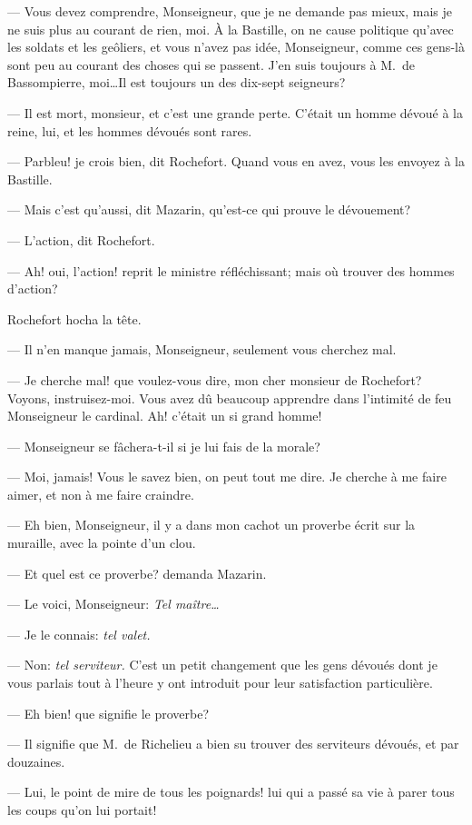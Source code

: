 — Vous devez comprendre, Monseigneur, que je ne demande pas mieux, mais je ne suis plus au courant de rien, moi. À la Bastille, on ne cause politique qu'avec les soldats et les geôliers, et vous n'avez pas idée, Monseigneur, comme ces gens-là sont peu au courant des choses qui se passent. J'en suis toujours à M.~de Bassompierre, moi\dots Il est toujours un des dix-sept seigneurs?

— Il est mort, monsieur, et c'est une grande perte. C'était un homme dévoué à la reine, lui, et les hommes dévoués sont rares.

— Parbleu! je crois bien, dit Rochefort. Quand vous en avez, vous les envoyez à la Bastille.

— Mais c'est qu'aussi, dit Mazarin, qu'est-ce qui prouve le dévouement?

— L'action, dit Rochefort.

— Ah! oui, l'action! reprit le ministre réfléchissant; mais où trouver des hommes d'action?

Rochefort hocha la tête.

— Il n'en manque jamais, Monseigneur, seulement vous cherchez mal.

— Je cherche mal! que voulez-vous dire, mon cher monsieur de Rochefort? Voyons, instruisez-moi. Vous avez dû beaucoup apprendre dans l'intimité de feu Monseigneur le cardinal. Ah! c'était un si grand homme!

— Monseigneur se fâchera-t-il si je lui fais de la morale?

— Moi, jamais! Vous le savez bien, on peut tout me dire. Je cherche à me faire aimer, et non à me faire craindre.

— Eh bien, Monseigneur, il y a dans mon cachot un proverbe écrit sur la muraille, avec la pointe d'un clou.

— Et quel est ce proverbe? demanda Mazarin.

— Le voici, Monseigneur: \textit{Tel maître\dots}

— Je le connais: \textit{tel valet.}

— Non: \textit{tel serviteur.} C'est un petit changement que les gens dévoués dont je vous parlais tout à l'heure y ont introduit pour leur satisfaction particulière.

— Eh bien! que signifie le proverbe?

— Il signifie que M.~de Richelieu a bien su trouver des serviteurs dévoués, et par douzaines.

— Lui, le point de mire de tous les poignards! lui qui a passé sa vie à parer tous les coups qu'on lui portait!

